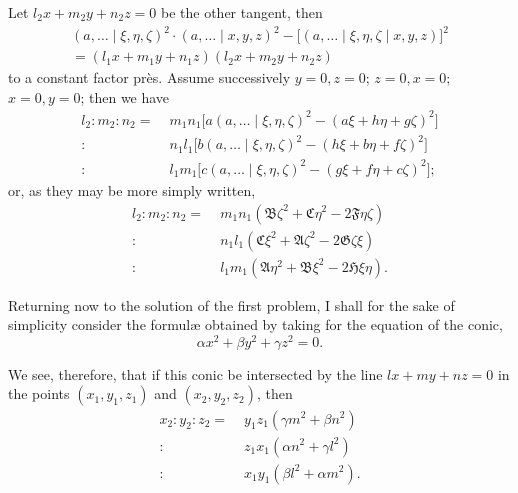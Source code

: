 \documentclass[11pt,a4paper]{article}
\begin{document}
Let $l_2 x + m_2 y + n_2 z = 0$ be the other tangent, then
\begin{align*}
(a, \ldots \mid \xi, \eta, \zeta)^2 \cdot (a, \ldots \mid x, y, z)^2 - \bigl[(a, \ldots \mid \xi, \eta, \zeta \mid x, y, z)\bigr]^2\\
= (l_1 x + m_1 y + n_1 z)(l_2 x + m_2 y + n_2 z)
\end{align*}
to a constant factor pr\`es. Assume successively $y = 0, z = 0$; $z = 0, x = 0$; $x = 0, y = 0$; then we have
\begin{align*}
l_2 : m_2 : n_2 = \;& m_1 n_1 \bigl[ a (a, \ldots \mid \xi, \eta, \zeta)^2 - (a\xi + h\eta + g\zeta)^2 \bigr]\\
:\;& n_1 l_1 \bigl[ b (a, \ldots \mid \xi, \eta, \zeta)^2 - (h\xi + b\eta + f\zeta)^2 \bigr]\\
:\;& l_1 m_1 \bigl[ c (a, \ldots \mid \xi, \eta, \zeta)^2 - (g\xi + f\eta + c\zeta)^2 \bigr];
\end{align*}
or, as they may be more simply written,
\begin{align*}
l_2 : m_2 : n_2 = \;& m_1 n_1 (\mathfrak{B}\zeta^2 + \mathfrak{C}\eta^2 - 2\mathfrak{F}\eta\zeta)\\
:\;& n_1 l_1 (\mathfrak{C}\xi^2 + \mathfrak{A}\zeta^2 - 2\mathfrak{G}\zeta\xi)\\
:\;& l_1 m_1 (\mathfrak{A}\eta^2 + \mathfrak{B}\xi^2 - 2\mathfrak{H}\xi\eta).
\end{align*}

\medskip

Returning now to the solution of the first problem, I shall for the sake of simplicity consider the formul\ae{} obtained by taking for the equation of the conic,
\[ \alpha x^2 + \beta y^2 + \gamma z^2 = 0. \]

\medskip

We see, therefore, that if this conic be intersected by the line $lx + my + nz = 0$ in the points $(x_1, y_1, z_1)$ and $(x_2, y_2, z_2)$, then
\begin{align*}
x_2 : y_2 : z_2 = \;& y_1 z_1 (\gamma m^2 + \beta n^2)\\
:\;& z_1 x_1 (\alpha n^2 + \gamma l^2)\\
:\;& x_1 y_1 (\beta l^2 + \alpha m^2).
\end{align*}

\medskip
\end{document}
